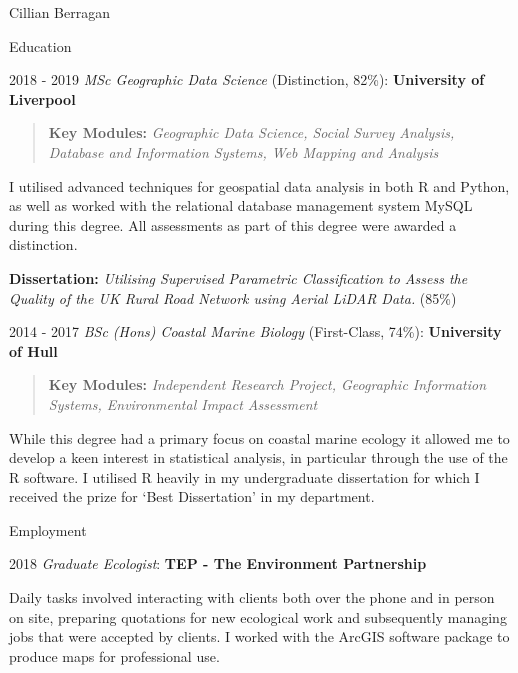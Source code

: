 \documentclass{scrartcl}
\begin{document}
\begin{cv}{Cillian Berragan}
\begin{cvlist}{Education}
\item[2018 - 2019] \normalsize\textit{MSc Geographic Data Science} (Distinction, 82\%): \textbf{University of Liverpool}

    \begin{quote}
        \small\textbf{Key Modules: }\textit{Geographic Data Science, Social Survey Analysis, Database and Information Systems, Web Mapping and Analysis}
    \end{quote}

    \small I utilised advanced techniques for geospatial data analysis in both R and Python, as well as worked with the relational database management system MySQL during this degree. All assessments as part of this degree were awarded a distinction.

        \textbf{Dissertation:} \textit{Utilising Supervised Parametric Classification to Assess the Quality of the UK Rural Road Network using Aerial LiDAR Data.} (85\%)

    \item[2014 - 2017] \normalsize\textit{BSc (Hons) Coastal Marine Biology} (First-Class, 74\%): \textbf{University of Hull}

    \begin{quote}
        \small \textbf{Key Modules:} \textit{Independent Research Project, Geographic Information Systems, Environmental Impact Assessment}
    \end{quote}

    \small While this degree had a primary focus on coastal marine ecology it allowed me to develop a keen interest in statistical analysis, in particular through the use of the R software. I utilised R heavily in my undergraduate dissertation for which I received the prize for ‘Best Dissertation’ in my department.

\end{cvlist}

\begin{cvlist}{Employment}

    \item[2018] \normalsize\textit{Graduate Ecologist}: \textbf{TEP - The Environment Partnership}

    \small Daily tasks involved interacting with clients both over the phone and in person on site, preparing quotations for new ecological work and subsequently managing jobs that were accepted by clients. I worked with the ArcGIS software package to produce maps for professional use.

\end{cvlist}



\end{cv}
\end{document}
